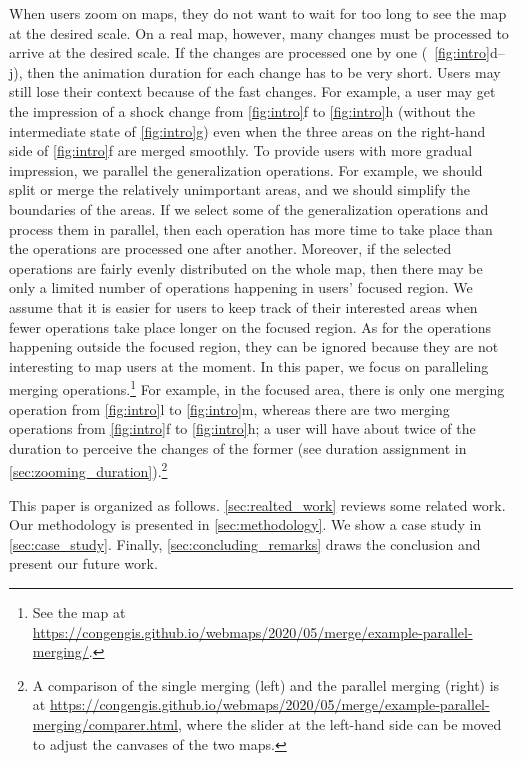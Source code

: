 \documentclass[]{interact}
\begin{document}
When users zoom on maps, 
they do not want to wait for too long to see the map at the desired scale.
On a real map, however, 
many changes must be processed to arrive at the desired scale.
If the changes are processed one by one 
(\eg~\figs\ref{fig:intro}d--j),
then the animation duration for each change has to be very short.
Users may still lose their context because of the fast changes.
For example, a user may get the impression of
a shock change from \fig\ref{fig:intro}f to \fig\ref{fig:intro}h
(without the intermediate state of \fig\ref{fig:intro}g)
even when the three areas on the right-hand side of \fig\ref{fig:intro}f
are merged smoothly.
To provide users with more gradual impression, 
we parallel the generalization operations.
For example, we should split or merge the relatively unimportant areas,
and we should simplify the boundaries of the areas.
If we select some of the generalization operations
and process them in parallel,
then each operation has more time to take place 
than the operations are processed one after another.
Moreover, if the selected operations are
fairly evenly distributed on the whole map, 
then there may be only a limited number of operations 
happening in users' focused region.
We assume that it is easier for users to keep track of their interested areas
when fewer operations take place longer on the focused region.
As for the operations happening outside the focused region,
they can be ignored because 
they are not interesting to map users at the moment.
In this paper, we focus on paralleling merging operations.\footnote{%
See the map at
\url{https://congengis.github.io/webmaps/2020/05/merge/example-parallel-merging/}.}
For example, in the focused area, there is only one merging operation 
from \fig\ref{fig:intro}l to \fig\ref{fig:intro}m,
whereas there are two merging operations  
from \fig\ref{fig:intro}f to \fig\ref{fig:intro}h;
a user will have about twice of the duration to perceive the changes of the former
(see duration assignment in \sect\ref{sec:zooming_duration}).\footnote{%
A comparison of the single merging (left) 
and the parallel merging (right) is at
\url{https://congengis.github.io/webmaps/2020/05/merge/example-parallel-merging/comparer.html}, 
where the slider at the left-hand side can be 
moved to adjust the canvases of the two maps.}


This paper is organized as follows.
\sect\ref{sec:realted_work} reviews some related work.
Our methodology is presented in \sect\ref{sec:methodology}.
We show a case study in \sect\ref{sec:case_study}.
Finally, \sect\ref{sec:concluding_remarks} draws the conclusion
and present our future work.
\end{document}

